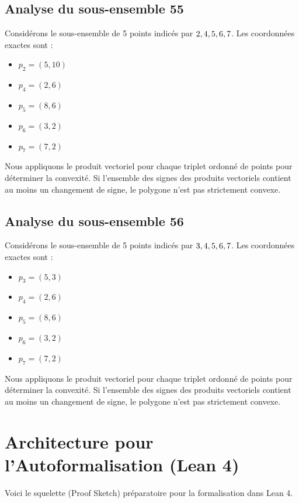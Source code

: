 \documentclass[11pt]{article}
\begin{document}
\subsection{Analyse du sous-ensemble 55}
Considérons le sous-ensemble de 5 points indicés par $\\{ 2, 4, 5, 6, 7 \\}$.
Les coordonnées exactes sont :
\begin{itemize}
\item $p_2 = (5, 10)$
\item $p_4 = (2, 6)$
\item $p_5 = (8, 6)$
\item $p_6 = (3, 2)$
\item $p_7 = (7, 2)$
\end{itemize}
Nous appliquons le produit vectoriel pour chaque triplet ordonné de points pour déterminer la convexité. Si l'ensemble des signes des produits vectoriels contient au moins un changement de signe, le polygone n'est pas strictement convexe.
\newpage

\subsection{Analyse du sous-ensemble 56}
Considérons le sous-ensemble de 5 points indicés par $\\{ 3, 4, 5, 6, 7 \\}$.
Les coordonnées exactes sont :
\begin{itemize}
\item $p_3 = (5, 3)$
\item $p_4 = (2, 6)$
\item $p_5 = (8, 6)$
\item $p_6 = (3, 2)$
\item $p_7 = (7, 2)$
\end{itemize}
Nous appliquons le produit vectoriel pour chaque triplet ordonné de points pour déterminer la convexité. Si l'ensemble des signes des produits vectoriels contient au moins un changement de signe, le polygone n'est pas strictement convexe.
\newpage

\section{Architecture pour l'Autoformalisation (Lean 4)}
Voici le squelette (Proof Sketch) préparatoire pour la formalisation dans Lean 4.
\end{document}
